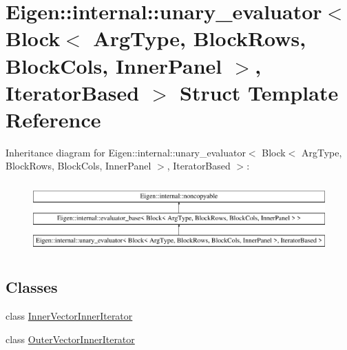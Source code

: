 \hypertarget{struct_eigen_1_1internal_1_1unary__evaluator_3_01_block_3_01_arg_type_00_01_block_rows_00_01_blodb73497179e7c432f93b3052e2754983}{}\section{Eigen\+::internal\+::unary\+\_\+evaluator$<$ Block$<$ Arg\+Type, Block\+Rows, Block\+Cols, Inner\+Panel $>$, Iterator\+Based $>$ Struct Template Reference}
\label{struct_eigen_1_1internal_1_1unary__evaluator_3_01_block_3_01_arg_type_00_01_block_rows_00_01_blodb73497179e7c432f93b3052e2754983}
Inheritance diagram for Eigen\+::internal\+::unary\+\_\+evaluator$<$ Block$<$ Arg\+Type, Block\+Rows, Block\+Cols, Inner\+Panel $>$, Iterator\+Based $>$\+:\begin{figure}[H]
\begin{center}
\leavevmode
\includegraphics[height=2.727273cm]{struct_eigen_1_1internal_1_1unary__evaluator_3_01_block_3_01_arg_type_00_01_block_rows_00_01_blodb73497179e7c432f93b3052e2754983}
\end{center}
\end{figure}
\subsection*{Classes}
\begin{DoxyCompactItemize}
\item 
class \mbox{\hyperlink{class_eigen_1_1internal_1_1unary__evaluator_3_01_block_3_01_arg_type_00_01_block_rows_00_01_bloc7b8c3454e32b582bbd24168a4ea19a1b}{Inner\+Vector\+Inner\+Iterator}}
\item 
class \mbox{\hyperlink{class_eigen_1_1internal_1_1unary__evaluator_3_01_block_3_01_arg_type_00_01_block_rows_00_01_bloc652d26bcece9990189dc15f4df1c964f}{Outer\+Vector\+Inner\+Iterator}}
\end{DoxyCompactItemize}
